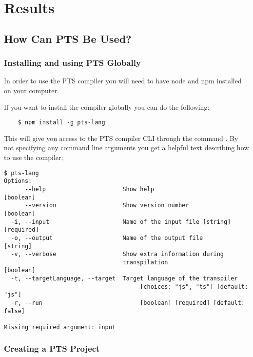 \chapter{Results}\label{ch:results}

\section{How Can PTS Be Used?}\label{sec:how-can-this-be-used?}

\subsection{Installing and using PTS Globally}\label{subsec:installing-and-using-pts-globally}

In order to use the PTS compiler you will need to have node and npm installed on your computer.

If you want to install the compiler globally you can do the following:

\begin{verbatim}
    $ npm install -g pts-lang
\end{verbatim}

This will give you access to the PTS compiler CLI through the command .
By not specifying any command line arguments you get a helpful text describing how to use the compiler;

\begin{verbatim}
$ pts-lang
Options:
      --help                      Show help                        [boolean]
      --version                   Show version number              [boolean]
  -i, --input                     Name of the input file [string] [required]
  -o, --output                    Name of the output file           [string]
  -v, --verbose                   Show extra information during
                                  transpilation                    [boolean]
  -t, --targetLanguage, --target  Target language of the transpiler
                                       [choices: "js", "ts"] [default: "js"]
  -r, --run                            [boolean] [required] [default: false]

Missing required argument: input
\end{verbatim}

\subsection{Creating a PTS Project}\label{subsec:creating-a-pts-project}

